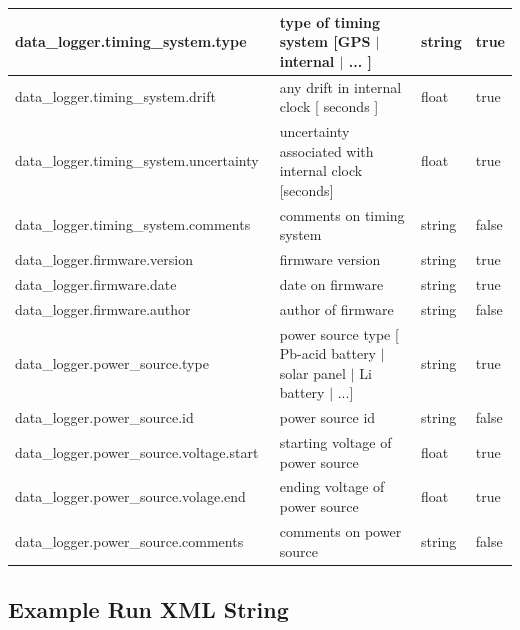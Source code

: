 \documentclass{article}
\begin{document}
\begin{table}[htb!]
\begin{tabular}{|l|p{3.2in}|l|l|}
        data\_logger.timing\_system.type\ & type of timing system [GPS $|$ internal $|$ ... ] & string & true \\ \hline
        data\_logger.timing\_system.drift\ & any drift in internal clock [ seconds ] & float & true \\ \hline
        data\_logger.timing\_system.uncertainty\ & uncertainty associated with internal clock [seconds] & float & true \\ \hline
        data\_logger.timing\_system.comments\ & comments on timing system & string & false \\ \hline
        data\_logger.firmware.version\ & firmware version & string & true \\ \hline
        data\_logger.firmware.date\ & date on firmware & string & true \\ \hline
        data\_logger.firmware.author\ & author of firmware & string & false \\ \hline
        data\_logger.power\_source.type\ & power source type [ Pb-acid battery $|$ solar panel $|$ Li battery $|$ ...] & string & true \\ \hline
        data\_logger.power\_source.id\ & power source id & string & false \\ \hline
        data\_logger.power\_source.voltage.start\ & starting voltage of power source & float & true \\ \hline
        data\_logger.power\_source.volage.end\ & ending voltage of power source & float & true \\ \hline
        data\_logger.power\_source.comments\ & comments on power source & string & false \\ \hline
    \end{tabular}
    \label{tab:run}
\end{table}

\subsection{Example Run XML String}
\end{document}
